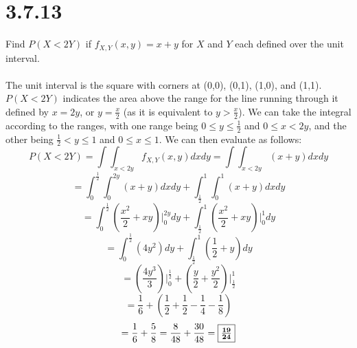 \documentclass{article}
\begin{document}
{\section*{3.7.13} 
Find \(P(X < 2Y)\) if \(f_{X,Y} (x, y) = x + y\) for \(X\) and \(Y\) each defined over the unit interval.
\\
\\
The unit interval is the square with corners at (0,0), (0,1), (1,0), and (1,1). \(P(X < 2Y)\) indicates the area above the range for the line running through it defined by \(x = 2y\), or \(y = \frac{x}{2}\) (as it is equivalent to \(y > \frac{x}{2}\)). We can take the integral according to the ranges, with one range being \(0 \leq y \leq \frac{1}{2}\) and \(0 \leq x < 2y\), and the other being \(\frac{1}{2} < y \leq 1\) and \(0 \leq x \leq 1\). We can then evaluate as follows: 
\[
P(X < 2Y) = \int \int_{x < 2y} f_{X,Y}(x,y)dxdy = \int \int_{x < 2y} (x+y) dxdy
\]
\[
= \int_{0}^{\frac{1}{2}} \int_{0}^{2y} (x+y) dxdy + \int_{\frac{1}{2}}^{1} \int_{0}^{1} (x+y) dxdy
\]
\[
= \int_{0}^{\frac{1}{2}} (\frac{x^2}{2} + xy) \Big|_{0}^{2y} dy + \int_{\frac{1}{2}}^{1} (\frac{x^2}{2} + xy) \Big|_{0}^{1} dy
\]
\[
= \int_{0}^{\frac{1}{2}} (4y^2) dy + \int_{\frac{1}{2}}^{1} (\frac{1}{2} + y) dy
\]
\[
= (\frac{4y^3}{3}) \Big|_{0}^{\frac{1}{2}} +  (\frac{y}{2} + \frac{y^2}{2}) \Big|_{\frac{1}{2}}^{1}
\]
\[
= \frac{1}{6} + (\frac{1}{2} + \frac{1}{2} - \frac{1}{4} - \frac{1}{8})
\]
\[
= \frac{1}{6} + \frac{5}{8} = \frac{8}{48} + \frac{30}{48} = \fbox{\(\mathbf{\frac{19}{24}}\)}
\]

}
\end{document}
